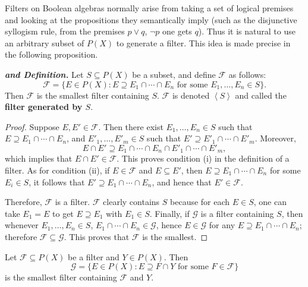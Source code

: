 \documentclass{article}
\def\F{\mathscr F}
\def\G{\mathscr G}
\begin{document}
\noindent Filters on Boolean algebras normally arise from taking a set of logical premises and looking at the propositions they semantically imply (such as the disjunctive syllogism rule, from the premises $p\vee q$, $\neg p$ one gets $q$).  Thus it is natural to use an arbitrary subset of $P(X)$ to generate a filter.  This idea is made precise in the following proposition. %
\begin{proposition}\label{filtergen}\textbf{\emph{and Definition.}}
Let $S\subseteq P(X)$ be a subset, and define $\F$ as follows:
$$\F=\{E\in P(X):E\supseteq E_1\cap\cdots\cap E_n\text{ for some }E_1,\dots,E_n\in S\}.$$
Then $\F$ is the smallest filter containing $S$.  $\F$ is denoted $\left<S\right>$ and called the \textbf{filter generated by $S$}.
\end{proposition}
\begin{proof}
Suppose $E,E'\in\F$.  Then there exist $E_1,\dots,E_n\in S$ such that $E\supseteq E_1\cap\cdots\cap E_n$, and $E'_1,\dots,E'_m\in S$ such that $E'\supseteq E'_1\cap\cdots\cap E'_m$.  Moreover,
$$E\cap E'\supseteq E_1\cap\cdots\cap E_n\cap E'_1\cap\cdots\cap E'_m,$$
which implies that $E\cap E'\in\F$.  This proves condition (i) in the definition of a filter.  As for condition (ii), if $E\in\F$ and $E\subseteq E'$, then $E\supseteq E_1\cap\cdots\cap E_n$ for some $E_i\in S$, it follows that $E'\supseteq E_1\cap\cdots\cap E_n$, and hence that $E'\in\F$.

Therefore, $\F$ is a filter.  $\F$ clearly contains $S$ because for each $E\in S$, one can take $E_1=E$ to get $E\supseteq E_1$ with $E_1\in S$.  Finally, if $\G$ is a filter containing $S$, then whenever $E_1,\dots,E_n\in S$, $E_1\cap\cdots\cap E_n\in\G$, hence $E\in\G$ for any $E\supseteq E_1\cap\cdots\cap E_n$; therefore $\F\subseteq\G$.  This proves that $\F$ is the smallest.
\end{proof}
\begin{exercise}\label{adjoinexer}
Let $\F\subseteq P(X)$ be a filter and $Y\in P(X)$.  Then
$$\G=\{E\in P(X):E\supseteq F\cap Y\text{ for some }F\in\F\}$$
is the smallest filter containing $\F$ and $Y$.
\end{exercise}
\end{document}
